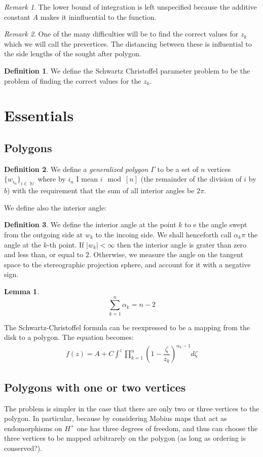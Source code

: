 \documentclass[10pt, a4paper]{article}
\theoremstyle{plain}
\newtheorem{lem}[thm]{Lemma}
\theoremstyle{definition}
\newtheorem{defn}{Definition}
\theoremstyle{remark}
\newtheorem{rem}{Remark}
\DeclareMathOperator{\N}{\mathbb{N}}
\begin{document}
\begin{rem}
	The lower bound of integration is left unspecified because the additive constant $ A $ makes it ininfluential to the function.
\end{rem}
\begin{rem}
	One of the many difficulties will be to find the correct values for $ z_k $ which we will call the prevertices. The distancing between these is influential to the side lengths of the sought after polygon.
\end{rem}
\begin{defn}
	We define the Schwartz Christoffel parameter problem to be the problem of finding the correct values for the $ z_k $.
\end{defn}
\section{Essentials}
\subsection{Polygons}
\begin{defn}
	We define a \emph{generalized polygon} $ \Gamma $ to be a set of $ n $ vertices $ \{w_{i_n}\}_{i\in\N} $ where by $ i_n $ I mean $ i\mod[n] $ (the remainder of the division of $ i $ by $ b $) with the requirement that the sum of all interior angles be $ 2\pi $. 
\end{defn}
We define also the interior angle:
\begin{defn}
	We define the interior angle at the point $ k $ to e the  angle swept from the outgoing side at $ w_{k} $ to the incoing side. We shall henceforth call $ \alpha_k\pi $ the angle at the $ k $-th point. If $ \left|w_k\right|<\infty $ then the interior angle is grater than zero and less than, or equal to $ 2 $. Otherwise, we measure the angle on the tangent space to the stereographic projection sphere, and account for it with a negative sign.
\end{defn}
\begin{lem}
	\label{lem:anglesum}
	$$ \sum_{k=1}^{n}\alpha_k=n-2 $$
\end{lem}
The Schwartz-Christoffel formula can be reexpressed to be a mapping from the disk to a polygon. The equation becomes:
\begin{gather*}
f(z)=A+C\int^{z}\prod_{k=1}^{n}\left(1-\dfrac{\zeta}{z_k}\right)^{\alpha_k-1}d\zeta
\end{gather*}
\subsection{Polygons with one or two vertices}
The problem is simpler in the case that there are only two or three vertices to the polygon. In particular, because by considering Mobius maps that act as endomorphisms on $ H^{+} $ one has three degrees of freedom, and thus can choose the three vertices to be mapped arbitrarely on the polygon (as long as ordering is conserved?).
\end{document}
